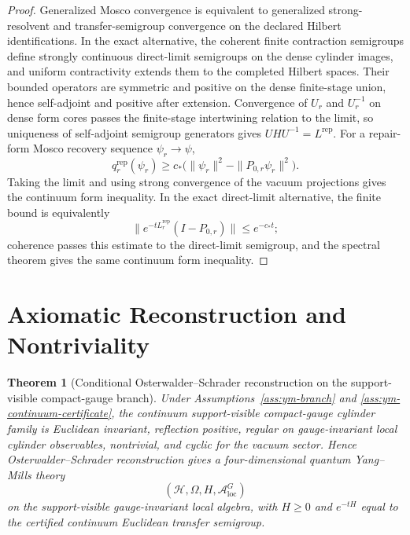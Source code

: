 \documentclass[11pt]{article}
\numberwithin{equation}{section}
\newtheorem{theorem}{Theorem}[section]
\theoremstyle{remark}
\newcommand{\Rep}{\mathrm{rep}}
\newcommand{\A}{\mathcal A}
\newcommand{\Hcal}{\mathcal H}
\begin{document}
\begin{proof}
Generalized Mosco convergence is equivalent to generalized strong-resolvent and
transfer-semigroup convergence on the declared Hilbert identifications. In the exact alternative,
the coherent finite contraction semigroups define strongly continuous direct-limit semigroups on
the dense cylinder images, and uniform contractivity extends them to the completed Hilbert
spaces. Their bounded operators are symmetric and positive on the dense finite-stage union, hence
self-adjoint and positive after extension. Convergence of \(U_r\)
and \(U_r^{-1}\) on dense form cores passes the finite-stage intertwining relation to the limit,
so uniqueness of self-adjoint semigroup generators gives \(UHU^{-1}=L^{\mathrm{rep}}\). For a
repair-form Mosco recovery sequence \(\psi_r\to\psi\),
\[
q_r^{\mathrm{rep}}(\psi_r)
\ge c_*\bigl(\|\psi_r\|^2-\|P_{0,r}\psi_r\|^2\bigr).
\]
Taking the limit and using strong convergence of the vacuum projections gives the continuum form
inequality. In the exact direct-limit alternative, the finite bound is equivalently
\[
\|e^{-tL_r^{\Rep}}(I-P_{0,r})\|\le e^{-c_*t};
\]
coherence passes this estimate to the direct-limit semigroup, and the spectral theorem gives the
same continuum form inequality.
\end{proof}

\section{Axiomatic Reconstruction and Nontriviality}

\begin{theorem}[Conditional Osterwalder--Schrader reconstruction on the support-visible compact-gauge branch]
\label{thm:os}
Under Assumptions~\ref{ass:ym-branch} and \ref{ass:ym-continuum-certificate}, the continuum
support-visible compact-gauge cylinder family is Euclidean invariant, reflection positive,
regular on gauge-invariant local cylinder observables, nontrivial, and cyclic for the vacuum
sector. Hence Osterwalder--Schrader reconstruction gives a four-dimensional quantum Yang--Mills
theory
\[
(\Hcal,\Omega,H,\A_{\mathrm{loc}}^{G})
\]
on the support-visible gauge-invariant local algebra, with \(H\ge0\) and
\(e^{-tH}\) equal to the certified continuum Euclidean transfer semigroup.
\end{theorem}
\end{document}
